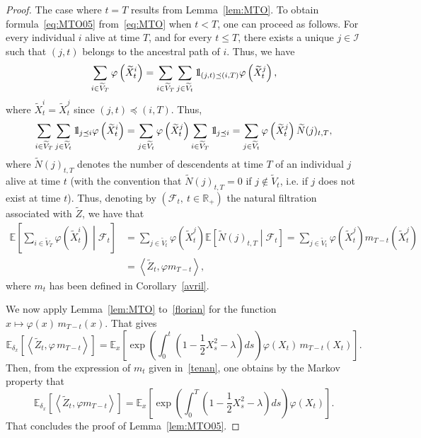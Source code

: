 \documentclass[AHL,Unicode,longabstracts,published]{cedram}
\newcommand{\Fo}{\mathcal{F}}
\newcommand{\Io}{\mathcal{I}}
\newcommand*\R{\mathbb{R}}
\newcommand*\E{\mathbb{E}}
\newcommand*\ind{{\mathchoice {\rm 1\mskip-4mu l} {\rm 1\mskip-4mu l} {\rm 1\mskip-4.5mu l} {\rm 1\mskip-5mu l}}}
\begin{document}
\begin{proof}
The case where $t=T$ results from Lemma~\ref{lem:MTO}.
To obtain formula~\eqref{eq:MTO05} from~\eqref{eq:MTO} when $t<T$, one can proceed as follows. For every individual $i$ alive at time $T$, and for every $t\leq T$, there exists a unique $j\in \Io$ such that $(j,t)$ belongs to the ancestral path of $i$. Thus, we have
\[
\sum_{i \in \widetilde{V}_{T}}\varphi\left(\widetilde{X}^{i}_{t}\right)=\sum_{i \in \widetilde{V}_{T}}\sum_{j \in \widetilde{V}_{t}} \ind_{(j, t) \preceq (i, T)} \varphi\left(\widetilde{X}^{j}_{t}\right),
\]
where $\widetilde{X}^{i}_{t}=\widetilde{X}^{j}_{t}$ since $(j,t)\preceq (i,T)$. Thus,
\[
\sum_{i \in \widetilde{V}_{T}}\sum_{j \in \widetilde{V}_{t}} \ind_{j \preceq i} \varphi\left(\widetilde{X}^{i}_{t}\right)=\sum_{j \in \widetilde{V}_{t}}\varphi\left(\widetilde{X}^{j}_{t}\right)\sum_{i \in \widetilde{V}_{T}} \ind_{j \preceq i} =\sum_{j \in \widetilde{V}_{t}}\varphi\left(\widetilde{X}^{j}_{t}\right)\widetilde{N}(j)_{t, T},
\]
where $\widetilde{N}(j)_{t, T}$ denotes the number of descendents at time $T$ of an individual $j$ alive at time $t$ (with the convention that $\widetilde{N}(j)_{t, T}=0$ if $j\notin \widetilde{V}_{t}$, i.e. if $j$ does not exist at time $t$). Thus, denoting by $\left(\Fo_{t},\ t\in\R_{+} \right)$ the natural filtration associated with $\widetilde Z$, we have that
\begin{equation}\label{florian}
\begin{split}
\E\left[\sum_{i \in \widetilde{V}_{T}}\varphi\left(\widetilde{X}^{i}_{t}\right)\middle| \Fo_{t}\right]&=\sum_{j \in \widetilde{V}_{t}}\varphi\left(\widetilde{X}^{j}_{t}\right)\E\left[\widetilde{N}(j)_{t, T}\middle| \Fo_{t}\right]=\sum_{j \in  \widetilde{V}_{t}}\varphi\left(\widetilde{X}^{j}_{t}\right)m_{T-t}\left(\widetilde{X}^{j}_{t}\right)\\
&=\left\langle \widetilde{Z}_{t},\varphi  m_{T-t}\right\rangle,
\end{split}
\end{equation}
where $m_{t}$ has been defined in Corollary~\ref{avril}.


We now apply Lemma~\ref{lem:MTO} to~\eqref{florian} for the function $x\mapsto \varphi(x)\,m_{T-t}(x)$. That gives
\[
\E_{\delta_{x}}\left[\left\langle \widetilde{Z}_{t},\varphi \,m_{T-t}\right\rangle\right]=\E_{x}\left[\exp\left(\int_{0}^{t} \left(1-\frac{1}{2}X_{s}^{2}-\lambda \right)ds \right)\varphi\left(X_{t}\right)\,m_{T-t}\left(X_{t}\right) \right].
\]
Then, from the expression of $m_{t}$ given in~\eqref{tenan}, one obtains by the Markov property that
\[
\E_{\delta_{x}}\left[\left\langle \widetilde{Z}_{t},\varphi  m_{T-t}\right\rangle\right]=\E_{x}\left[\exp\left(\int_{0}^{T} \left(1-\frac{1}{2}X_{s}^{2}-\lambda \right)ds \right)\varphi\left(X_{t}\right) \right].
\]
That concludes the proof of Lemma~\ref{lem:MTO05}.
\end{proof}
\end{document}
